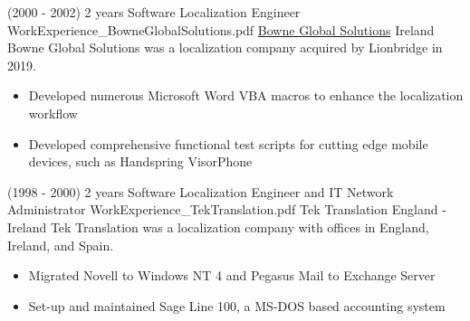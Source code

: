 \begin{twenty}
\twentyitem
  {(2000 - 2002) 2 years}
  {Software Localization Engineer}
  {WorkExperience_BowneGlobalSolutions.pdf}
  {\href{https://www.lionbridge.com/}{Bowne Global Solutions}}
  {Ireland}
  {Bowne Global Solutions was a localization company acquired by Lionbridge in 2019.}
  {
  }
  {\begin{itemize}
    \item Developed numerous Microsoft Word VBA macros to enhance the localization workflow
    \item Developed comprehensive functional test scripts for cutting edge mobile devices, such as Handspring VisorPhone
  \end{itemize}}
\end{twenty}

\begin{twenty}
\twentyitem
  {(1998 - 2000) 2 years}
  {Software Localization Engineer and IT Network Administrator}
  {WorkExperience_TekTranslation.pdf}
  {Tek Translation}
  {England - Ireland}
  {Tek Translation was a localization company with offices in England, Ireland, and Spain.}
  {
  }
  {\begin{itemize}
    \item Migrated Novell to Windows NT 4 and Pegasus Mail to Exchange Server
    \item Set-up and maintained Sage Line 100, a MS-DOS based accounting system
  \end{itemize}}
\end{twenty}
